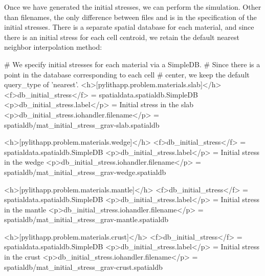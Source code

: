 Once we have generated the initial stresses, we can perform the
simulation. Other than filenames, the only difference between
 files  and
 is in the specification of the initial
stresses. There is a separate spatial database for each material, and
since there is an initial stress for each cell centroid, we retain the
default nearest neighbor interpolation method:
\begin{cfg}
# We specify initial stresses for each material via a SimpleDB.
# Since there is a point in the database corresponding to each cell
# center, we keep the default query_type of 'nearest'.
<h>[pylithapp.problem.materials.slab]</h>
<f>db_initial_stress</f> = spatialdata.spatialdb.SimpleDB
<p>db_initial_stress.label</p> = Initial stress in the slab
<p>db_initial_stress.iohandler.filename</p> = spatialdb/mat_initial_stress_grav-slab.spatialdb

<h>[pylithapp.problem.materials.wedge]</h>
<f>db_initial_stress</f> = spatialdata.spatialdb.SimpleDB
<p>db_initial_stress.label</p> = Initial stress in the wedge
<p>db_initial_stress.iohandler.filename</p> = spatialdb/mat_initial_stress_grav-wedge.spatialdb

<h>[pylithapp.problem.materials.mantle]</h>
<f>db_initial_stress</f> = spatialdata.spatialdb.SimpleDB
<p>db_initial_stress.label</p> = Initial stress in the mantle
<p>db_initial_stress.iohandler.filename</p> = spatialdb/mat_initial_stress_grav-mantle.spatialdb

<h>[pylithapp.problem.materials.crust]</h>
<f>db_initial_stress</f> = spatialdata.spatialdb.SimpleDB
<p>db_initial_stress.label</p> = Initial stress in the crust
<p>db_initial_stress.iohandler.filename</p> =
spatialdb/mat_initial_stress_grav-crust.spatialdb
\end{cfg}

